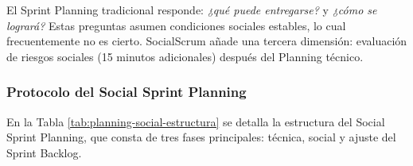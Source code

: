 El Sprint Planning tradicional \cite{schwaber2020scrum} responde: \textit{¿qué puede entregarse?} y \textit{¿cómo se logrará?} Estas preguntas asumen condiciones sociales estables, lo cual frecuentemente no es cierto. SocialScrum añade una tercera dimensión: evaluación de riesgos sociales (15 minutos adicionales) después del Planning técnico.

\subsubsection{Protocolo del Social Sprint Planning}

En la Tabla \ref{tab:planning-social-estructura} se detalla la estructura del Social Sprint Planning, que consta de tres fases principales: técnica, social y ajuste del Sprint Backlog.

\begingroup
\scriptsize
\renewcommand{\arraystretch}{1.4}
\setlength{\tabcolsep}{4pt}
\setlength{\LTleft}{0pt}
\setlength{\LTright}{0pt}

